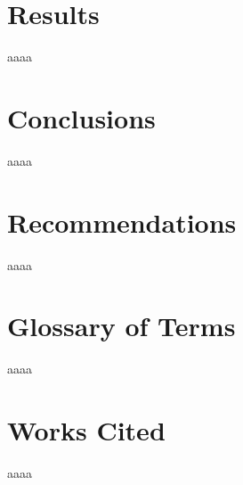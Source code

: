 \documentclass[12pt]{article}
\begin{document}
\section{Results}
aaaa

\section{Conclusions}
aaaa

\section{Recommendations}
aaaa

\section{Glossary of Terms}
aaaa

\section{Works Cited}
aaaa
\end{document}
